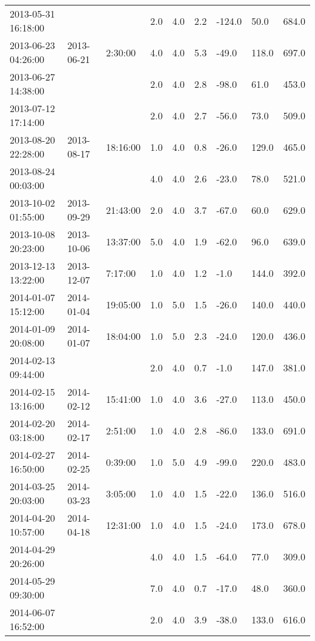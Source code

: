 \begin{longtable}{lllllllll}
        2013-05-31 16:18:00 & ~ & ~ & 2.0 & 4.0 & 2.2 & -124.0 & 50.0 & 684.0 \\ 
        2013-06-23 04:26:00 & 2013-06-21 & 2:30:00 & 4.0 & 4.0 & 5.3 & -49.0 & 118.0 & 697.0 \\ 
        2013-06-27 14:38:00 & ~ & ~ & 2.0 & 4.0 & 2.8 & -98.0 & 61.0 & 453.0 \\ 
        2013-07-12 17:14:00 & ~ & ~ & 2.0 & 4.0 & 2.7 & -56.0 & 73.0 & 509.0 \\ 
        2013-08-20 22:28:00 & 2013-08-17 & 18:16:00 & 1.0 & 4.0 & 0.8 & -26.0 & 129.0 & 465.0 \\ 
        2013-08-24 00:03:00 & ~ & ~ & 4.0 & 4.0 & 2.6 & -23.0 & 78.0 & 521.0 \\ 
        2013-10-02 01:55:00 & 2013-09-29 & 21:43:00 & 2.0 & 4.0 & 3.7 & -67.0 & 60.0 & 629.0 \\ 
        2013-10-08 20:23:00 & 2013-10-06 & 13:37:00 & 5.0 & 4.0 & 1.9 & -62.0 & 96.0 & 639.0 \\ 
        2013-12-13 13:22:00 & 2013-12-07 & 7:17:00 & 1.0 & 4.0 & 1.2 & -1.0 & 144.0 & 392.0 \\ 
        2014-01-07 15:12:00 & 2014-01-04 & 19:05:00 & 1.0 & 5.0 & 1.5 & -26.0 & 140.0 & 440.0 \\ 
        2014-01-09 20:08:00 & 2014-01-07 & 18:04:00 & 1.0 & 5.0 & 2.3 & -24.0 & 120.0 & 436.0 \\ 
        2014-02-13 09:44:00 & ~ & ~ & 2.0 & 4.0 & 0.7 & -1.0 & 147.0 & 381.0 \\ 
        2014-02-15 13:16:00 & 2014-02-12 & 15:41:00 & 1.0 & 4.0 & 3.6 & -27.0 & 113.0 & 450.0 \\ 
        2014-02-20 03:18:00 & 2014-02-17 & 2:51:00 & 1.0 & 4.0 & 2.8 & -86.0 & 133.0 & 691.0 \\ 
        2014-02-27 16:50:00 & 2014-02-25 & 0:39:00 & 1.0 & 5.0 & 4.9 & -99.0 & 220.0 & 483.0 \\ 
        2014-03-25 20:03:00 & 2014-03-23 & 3:05:00 & 1.0 & 4.0 & 1.5 & -22.0 & 136.0 & 516.0 \\ 
        2014-04-20 10:57:00 & 2014-04-18 & 12:31:00 & 1.0 & 4.0 & 1.5 & -24.0 & 173.0 & 678.0 \\ 
        2014-04-29 20:26:00 & ~ & ~ & 4.0 & 4.0 & 1.5 & -64.0 & 77.0 & 309.0 \\ 
        2014-05-29 09:30:00 & ~ & ~ & 7.0 & 4.0 & 0.7 & -17.0 & 48.0 & 360.0 \\ 
        2014-06-07 16:52:00 & ~ & ~ & 2.0 & 4.0 & 3.9 & -38.0 & 133.0 & 616.0 \\ 

\end{longtable}
